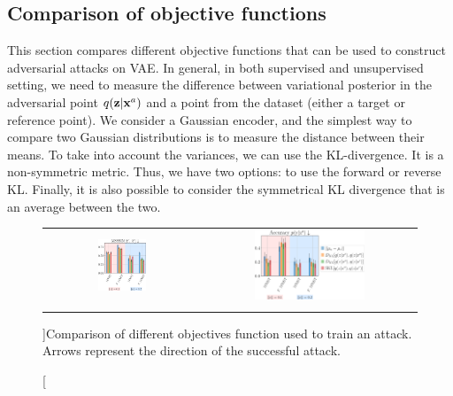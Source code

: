 \subsection{Comparison of objective functions} \label{appendix:objectives}
This section compares different objective functions that can be used to construct adversarial attacks on VAE. In general, in both supervised and unsupervised setting, we need to measure the difference between variational posterior in the adversarial point $q({\mathbf{z}}|{\mathbf{x}}^a)$ and a point from the dataset (either a target or reference point). We consider a Gaussian encoder, and the simplest way to compare two Gaussian distributions is to measure the distance between their means. To take into account the variances, we can use the KL-divergence. It is a non-symmetric metric. Thus, we have two options: to use the forward or reverse KL. Finally, it is also possible to consider the symmetrical KL divergence that is an average between the two.


\begin{figure}[ht]
    \centering
    \begin{tabular}{cc}
        \includegraphics[width=0.33\textwidth]{pics/3_adv_att/Objectives_0} &
        \includegraphics[width=0.54\textwidth]{pics/3_adv_att/Objectives_1.pdf} \\
        \multirow{2}{0.45\columnwidth}{\centering {\small (a) Reconstructions similarity: adversarial point and the reference.}} &
        \multirow{2}{0.45\columnwidth}{\centering {\small (b) Adversarial Accuracy.} } 
        \\
        \\
    \end{tabular}
    \caption[][\baselineskip]{Comparison of different objectives function used to train an attack. Arrows represent the direction of the successful attack.}
\label{fig:objectives}
          \vspace*{\baselineskip}
\end{figure}

